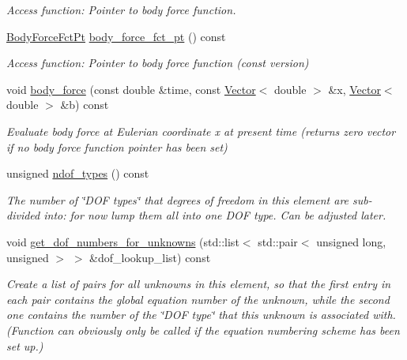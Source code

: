 \begin{DoxyCompactItemize}
\begin{DoxyCompactList}\small\item\em Access function\+: Pointer to body force function. \end{DoxyCompactList}\item 
\hyperlink{classoomph_1_1AxisymmetricLinearElasticityEquationsBase_afa35b69a888eecae4b5f199a1adf88c5}{Body\+Force\+Fct\+Pt} \hyperlink{classoomph_1_1AxisymmetricLinearElasticityEquationsBase_add2664f22e677925a3163547a1dd5ffa}{body\+\_\+force\+\_\+fct\+\_\+pt} () const
\begin{DoxyCompactList}\small\item\em Access function\+: Pointer to body force function (const version) \end{DoxyCompactList}\item 
void \hyperlink{classoomph_1_1AxisymmetricLinearElasticityEquationsBase_ad388a41f086f181a3c1608a5fb337ac6}{body\+\_\+force} (const double \&time, const \hyperlink{classoomph_1_1Vector}{Vector}$<$ double $>$ \&x, \hyperlink{classoomph_1_1Vector}{Vector}$<$ double $>$ \&b) const
\begin{DoxyCompactList}\small\item\em Evaluate body force at Eulerian coordinate x at present time (returns zero vector if no body force function pointer has been set) \end{DoxyCompactList}\item 
unsigned \hyperlink{classoomph_1_1AxisymmetricLinearElasticityEquationsBase_a46c5dca6d1bc3e471f71cb44bdc06284}{ndof\+\_\+types} () const
\begin{DoxyCompactList}\small\item\em The number of \char`\"{}\+D\+O\+F types\char`\"{} that degrees of freedom in this element are sub-\/divided into\+: for now lump them all into one D\+OF type. Can be adjusted later. \end{DoxyCompactList}\item 
void \hyperlink{classoomph_1_1AxisymmetricLinearElasticityEquationsBase_a714fb359257e5a262e2e1368fcfc1ccb}{get\+\_\+dof\+\_\+numbers\+\_\+for\+\_\+unknowns} (std\+::list$<$ std\+::pair$<$ unsigned long, unsigned $>$ $>$ \&dof\+\_\+lookup\+\_\+list) const
\begin{DoxyCompactList}\small\item\em Create a list of pairs for all unknowns in this element, so that the first entry in each pair contains the global equation number of the unknown, while the second one contains the number of the \char`\"{}\+D\+O\+F type\char`\"{} that this unknown is associated with. (Function can obviously only be called if the equation numbering scheme has been set up.) \end{DoxyCompactList}\end{DoxyCompactItemize}
